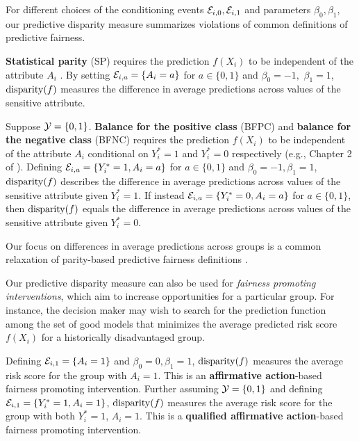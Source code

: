 \documentclass{article}
\begin{document}
For different choices of the conditioning events $\mathcal{E}_{i,0}, \mathcal{E}_{i,1}$ and parameters $\beta_0, \beta_1$, our predictive disparity measure summarizes violations of common definitions of predictive fairness.

\begin{definition} \label{definition: Statistical parity}
    \textbf{Statistical parity} (SP) requires the prediction $f(X_i)$ to be independent of the attribute $A_i$ \cite{Dwork2012, ZemelEtAl(13), FeldmanEtAl(15)}. By setting $\mathcal{E}_{i,a} = \{A_i = a\}$ for $a \in \{0, 1\}$ and ${\beta_0 = -1},$ ${\beta_1 = 1}$, $\operatorname{disparity}(f)$ measures the difference in average predictions across values of the sensitive attribute.
\end{definition} 

\begin{definition}
\label{definition: balance for positive and negative class}
Suppose $\mathcal{Y} = \{0, 1\}$. \textbf{Balance for the positive class} (BFPC) and \textbf{balance for the negative class} (BFNC) requires the prediction $f(X_i)$ to be independent of the attribute $A_i$ conditional on $Y_i^* = 1$ and $Y_i^* = 0$ respectively (e.g., Chapter 2 of \cite{barocas-hardt-narayanan}). Defining $\mathcal{E}_{i,a} = \{Y_i^* = 1, A_i = a\}$ for $a \in \{0, 1\}$ and $\beta_0 = -1, \beta_1 = 1$, $\operatorname{disparity}(f)$ describes the difference in average predictions across values of the sensitive attribute given $Y_i^* = 1$. If instead $\mathcal{E}_{i,a} = \{Y_i^* = 0, A_i = a\}$ for $a \in \{0, 1\}$, then $\operatorname{disparity}(f)$ equals the difference in average predictions across values of the sensitive attribute given $Y_i^* = 0$. 
\end{definition}

Our focus on differences in average predictions across groups is a common relaxation of parity-based predictive fairness definitions \cite{CorbettDaviesEtAl2017, MitchellEtAl(19)}.

Our predictive disparity measure can also be used for \textit{fairness promoting interventions}, which aim to increase opportunities for a particular group. %
For instance, the decision maker may wish to search for the prediction function among the set of good models that minimizes the average predicted risk score $f(X_i)$ for a historically disadvantaged group.

\begin{definition}\label{definition: affirmative action and qualified affirmative action}
    Defining $\mathcal{E}_{i,1} = \{A_i = 1\}$ and $\beta_0 = 0, \beta_1 = 1$, $\operatorname{disparity}(f)$ measures the average risk score for the group with $A_i = 1$. This is an \textbf{affirmative action}-based fairness promoting intervention. Further assuming $\mathcal{Y} = \{0, 1\}$ and defining $\mathcal{E}_{i,1} = \{Y_i^* = 1, A_i = 1\}$, $\operatorname{disparity}(f)$ measures the average risk score for the group with both $Y_i^* = 1$, $A_i = 1$. This is a \textbf{qualified affirmative action}-based fairness promoting intervention.
\end{definition}
\end{document}
